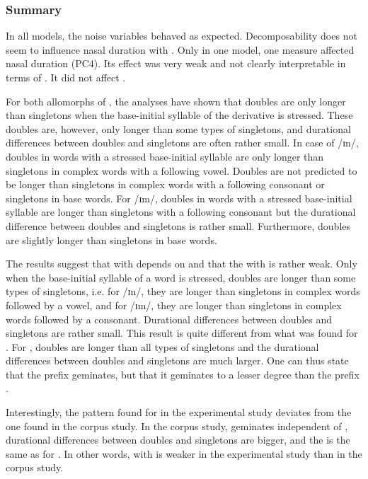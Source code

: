 \subsubsection{Summary}


In all models, the noise variables behaved as expected. Decomposability does not seem to influence nasal duration with . Only in one model, one  measure affected nasal duration (\textsc{PC4}). Its effect was very weak and not clearly interpretable in terms of . It did not affect .


For both allomorphs of , the analyses have shown that doubles are only longer than singletons when the base-initial syllable of the derivative is stressed. These doubles are, however, only longer than some types of singletons, and durational differences between doubles and singletons are often rather small. 
In case of /ɪn/, doubles in words with a stressed base-initial syllable are only longer than singletons in complex words with a following vowel. Doubles are not predicted to be longer than singletons in complex words with a following consonant or singletons in base words. 
For /ɪm/, doubles in words with a stressed base-initial syllable are longer than singletons with a following consonant but the durational difference between doubles and singletons is rather small.
Furthermore, doubles are slightly longer than singletons in base words.


The results suggest that  with  depends on  and that the  with  is rather weak. Only when the base-initial syllable of a word is stressed, doubles are longer than some types of singletons, i.e. for /ɪn/, they are longer than singletons in complex words followed by a vowel, and for /ɪm/, they are longer than singletons in complex words followed by a consonant. Durational differences between doubles and singletons are rather small. This result is quite different from what was found for . For , doubles are longer than all types of singletons and the durational differences between doubles and singletons are much larger. One can thus state that the prefix  geminates, but that it geminates to a lesser degree than the prefix .

Interestingly, the  pattern found for  in the experimental study deviates from the one found in the corpus study. In the corpus study,  geminates independent of , durational differences between doubles and singletons are bigger, and the  is the same as for . In other words,  with  is weaker in the experimental study than in the corpus study.

